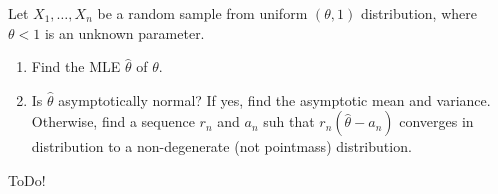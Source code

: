 
\begin{exercise}

Let $X_1, \dots, X_n$ be a random sample from uniform $(\theta, 1)$ distribution, where $\theta < 1$ is an unknown parameter.

\begin{enumerate}[label = (\alph*)]

    \item Find the MLE $\hat \theta$ of $\theta$.

    \item Is $\hat \theta$ asymptotically normal?
    If yes, find the asymptotic mean and variance.
    Otherwise, find a sequence $r_n$ and $a_n$ suh that $r_n (\hat \theta - a_n)$ converges in distribution to a non-degenerate (not pointmass) distribution.

\end{enumerate}

\end{exercise}


\begin{solution}

ToDo!

\end{solution}

